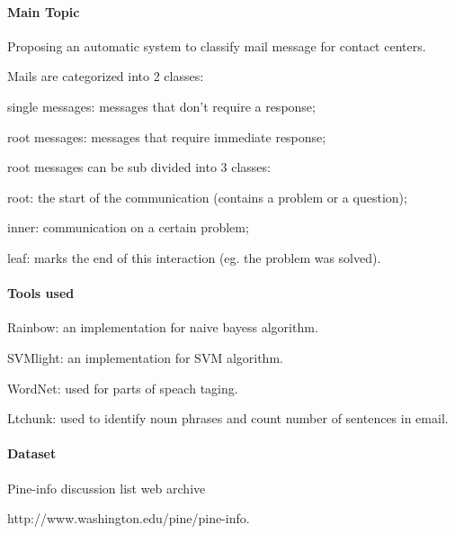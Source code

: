 \documentclass[12pt]{article}
\newenvironment{my_itemize}
{\begin{itemize}
  \setlength{\itemsep}{0cm}
  \setlength{\parskip}{0cm}}
{\end{itemize}}
\begin{document}
\paragraph{Main Topic}
\begin{my_itemize}
    \item Proposing an automatic system to classify mail message for contact centers.
    \item Mails are categorized into 2 classes:
    \begin{my_itemize}
        \item single messages: messages that don't require a response;
        \item root messages: messages that require immediate response;
        \item root messages can be sub divided into 3 classes:
        \begin{my_itemize}
            \item root: the start of the communication (contains a problem or a question);
            \item inner: communication on a certain problem;
            \item leaf: marks the end of this interaction (eg. the problem was solved).
        \end{my_itemize}
    \end{my_itemize}
\end{my_itemize}

\paragraph{Tools used}
\begin{my_itemize}
    \item Rainbow: an implementation for naive bayess algorithm.
    \item SVMlight: an implementation for SVM algorithm.
    \item WordNet: used for parts of speach taging.
    \item Ltchunk: used to identify noun phrases and count number of sentences in email.
\end{my_itemize}

\paragraph{Dataset}
\begin{my_itemize}
    \item Pine-info discussion list web archive
    \begin{my_itemize}
        \item http://www.washington.edu/pine/pine-info.
    \end{my_itemize}
\end{my_itemize}
\end{document}
